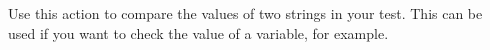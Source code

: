 

Use this action to compare the values of two strings in your test. This can be used if you want to check the value of a variable, for example. 
